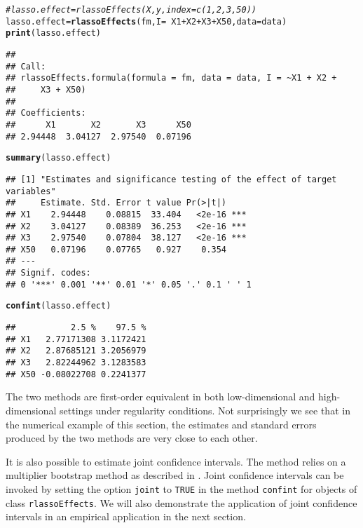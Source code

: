 \documentclass{amsart}\usepackage[]{graphicx}\usepackage[]{color}
\makeatletter
\newcommand{\hlcom}[1]{\textcolor[rgb]{0.678,0.584,0.686}{\textit{#1}}}%
\newcommand{\hlopt}[1]{\textcolor[rgb]{0,0,0}{#1}}%
\newcommand{\hlstd}[1]{\textcolor[rgb]{0.345,0.345,0.345}{#1}}%
\newcommand{\hlkwb}[1]{\textcolor[rgb]{0.69,0.353,0.396}{#1}}%
\newcommand{\hlkwc}[1]{\textcolor[rgb]{0.333,0.667,0.333}{#1}}%
\newcommand{\hlkwd}[1]{\textcolor[rgb]{0.737,0.353,0.396}{\textbf{#1}}}%
\newenvironment{kframe}{%
 \def\at@end@of@kframe{}%
 \ifinner\ifhmode%
  \def\at@end@of@kframe{\end{minipage}}%
  \begin{minipage}{\columnwidth}%
 \fi\fi%
 \def\FrameCommand##1{\hskip\@totalleftmargin \hskip-\fboxsep
 \colorbox{shadecolor}{##1}\hskip-\fboxsep
     \hskip-\linewidth \hskip-\@totalleftmargin \hskip\columnwidth}%
 \MakeFramed {\advance\hsize-\width
   \@totalleftmargin\z@ \linewidth\hsize
   \@setminipage}}%
 {\par\unskip\endMakeFramed%
 \at@end@of@kframe}
\newenvironment{knitrout}{}{} %
\newcommand{\code}[1]{\texttt{#1}}
\makeatother
\begin{document}
\begin{knitrout}
\color{fgcolor}\begin{kframe}
\begin{alltt}
\hlcom{# lasso.effect = rlassoEffects(X, y, index=c(1,2,3,50))}
\hlstd{lasso.effect} \hlkwb{=} \hlkwd{rlassoEffects}\hlstd{(fm,} \hlkwc{I} \hlstd{=} \hlopt{~}\hlstd{X1} \hlopt{+} \hlstd{X2} \hlopt{+} \hlstd{X3} \hlopt{+} \hlstd{X50,} \hlkwc{data} \hlstd{= data)}
\hlkwd{print}\hlstd{(lasso.effect)}
\end{alltt}
\begin{verbatim}
## 
## Call:
## rlassoEffects.formula(formula = fm, data = data, I = ~X1 + X2 + 
##     X3 + X50)
## 
## Coefficients:
##      X1       X2       X3      X50  
## 2.94448  3.04127  2.97540  0.07196
\end{verbatim}
\begin{alltt}
\hlkwd{summary}\hlstd{(lasso.effect)}
\end{alltt}
\begin{verbatim}
## [1] "Estimates and significance testing of the effect of target variables"
##     Estimate. Std. Error t value Pr(>|t|)    
## X1    2.94448    0.08815  33.404   <2e-16 ***
## X2    3.04127    0.08389  36.253   <2e-16 ***
## X3    2.97540    0.07804  38.127   <2e-16 ***
## X50   0.07196    0.07765   0.927    0.354    
## ---
## Signif. codes:  
## 0 '***' 0.001 '**' 0.01 '*' 0.05 '.' 0.1 ' ' 1
\end{verbatim}
\begin{alltt}
\hlkwd{confint}\hlstd{(lasso.effect)}
\end{alltt}
\begin{verbatim}
##           2.5 %    97.5 %
## X1   2.77171308 3.1172421
## X2   2.87685121 3.2056979
## X3   2.82244962 3.1283583
## X50 -0.08022708 0.2241377
\end{verbatim}
\end{kframe}
\end{knitrout}

The two methods are first-order equivalent in both low-dimensional and high-dimensional settings under regularity conditions.  Not surprisingly we see that in the numerical example of this section, the estimates and standard errors produced by the two methods are very close to each other.  

It is also possible to estimate joint confidence intervals. The method relies on a multiplier bootstrap method as described in \cite{BCK2014}. Joint confidence intervals can be invoked by setting the option \code{joint} to \code{TRUE} in the method \code{confint} for objects of class \code{rlassoEffects}. We will also demonstrate the application of joint confidence intervals in an empirical application in the next section.
\end{document}
